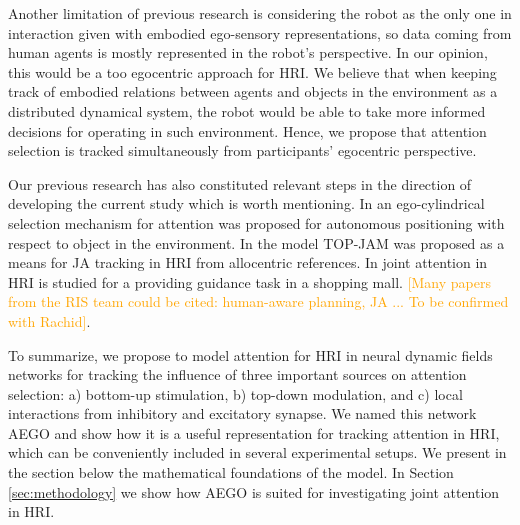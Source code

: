 \documentclass[letterpaper, 10 pt, conference]{ieeeconf}  %
\begin{document}
	
	
	
	
	Another limitation of previous research is considering the robot as the only one in interaction given with embodied ego-sensory representations, so data coming from human agents is mostly represented in the robot's perspective. In our opinion, this would be a too egocentric approach for HRI. We believe that when keeping track of embodied relations between agents and objects in the environment as a distributed dynamical system, the robot would be able to take more informed decisions for operating in such environment. Hence, we propose that attention selection is tracked simultaneously from participants' egocentric perspective. 
	 
	Our previous research has also constituted relevant steps in the direction of developing the current study which is worth mentioning. In \cite{chame2016} an ego-cylindrical selection mechanism for attention was proposed for autonomous positioning with respect to object in the environment. In \cite{chame2023top} the model TOP-JAM was proposed as a means for JA tracking in HRI from allocentric references. In \cite{heikkila2019} joint attention in HRI is studied for a providing guidance task in a shopping mall. \textcolor{orange}{[Many papers from the RIS team could be cited: human-aware planning, JA ... To be confirmed with Rachid]}.
	 
	To summarize, we propose to model attention for HRI in neural dynamic fields networks for tracking the influence of three important sources on attention selection: a) bottom-up stimulation, b) top-down modulation, and c) local interactions from inhibitory and excitatory synapse. We named this network AEGO and show how it is a useful representation for tracking attention in HRI, which can be conveniently included in several experimental setups. We present in the section below the mathematical foundations of the model. In Section \ref{sec:methodology} we show how AEGO is suited for investigating joint attention in HRI.
	
\end{document}
